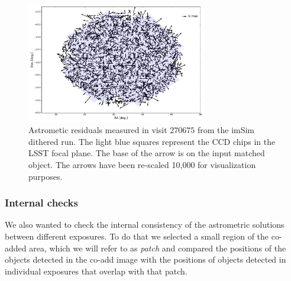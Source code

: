\documentclass[\docopts]{\docclass}
\begin{document}
\begin{figure}
  \centering
  \includegraphics[width=0.7\textwidth]{astrometry_imsim_dithered_interp}
  \caption{Astrometic residuals measured in visit $270675$ from the imSim dithered run. The light blue squares represent the CCD chips in
  the LSST focal plane. The base of the arrow is on the input matched object. The arrows have been re-scaled 10,000 for visualization purposes.}
  \label{fig:astrometry_c}
\end{figure}


\subsubsection{Internal checks}
\label{sec:internal_astrometry}

We also wanted to check the internal consistency of the astrometric solutions between different exposures. To do that we selected a small
region of the co-added area, which we will refer to as \textit{patch} and compared the positions of the objects detected in the co-add
image with the positions of objects detected in individual exposures that overlap with that patch.
\end{document}
